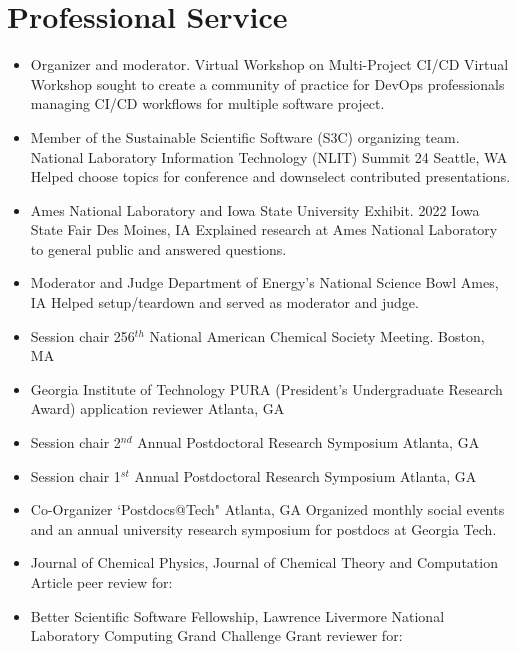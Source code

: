 \documentclass[11pt,a4paper,sans]{moderncv}
\begin{document}
\section{Professional Service}
\vspace{5pt}
\begin{itemize}
	\item{
	      {Organizer and moderator.}
	      {Virtual Workshop on Multi-Project CI/CD}
	      {Virtual}
	      {}
	      {Workshop sought to create a community of practice for DevOps 
		  professionals managing CI/CD workflows for multiple software 
		  project.}}
	\item{
		  {Member of the Sustainable Scientific Software (S3C) organizing team.}  
	      {National Laboratory Information Technology (NLIT) Summit 24}
		  {Seattle, WA}
		  {}
		  {Helped choose topics for conference and downselect contributed 
		  presentations.}}
	\item{
		  {Ames National Laboratory and Iowa State University Exhibit.}
	      {2022 Iowa State Fair}
		  {Des Moines, IA}
		  {}
		  {Explained research at Ames National Laboratory to general public and
		   answered questions.}}
	\item{
          {Moderator and Judge}
          {Department of Energy's National Science Bowl}
          {Ames, IA}
          {}
          {Helped setup/teardown and served as moderator and judge.}}
	\item{
	      {Session chair}
          {256$^{th}$ National American Chemical Society Meeting.}
          {Boston, MA}
          {}
          {}}
	\item{
          {Georgia Institute of Technology}
          {PURA (President's Undergraduate Research Award) application reviewer}
          {Atlanta, GA}
          {}
          {}}
	\item{
	     {Session chair}
         {2$^{nd}$ Annual Postdoctoral Research Symposium}
         {Atlanta, GA}
         {}
         {}}
	\item{
          {Session chair}
          {1$^{st}$ Annual Postdoctoral Research Symposium}
          {Atlanta, GA}
          {}
          {}}
	\item{
        {Co-Organizer}
        {`Postdocs@Tech"}
        {Atlanta, GA}
        {}
        {Organized monthly social events and an annual university research 
		 symposium for postdocs at Georgia Tech.}}
	\item{\cventry{}
          {Journal of Chemical Physics, Journal of Chemical Theory and
          Computation}
          {Article peer review for:}
		  {}
          {}
          {}}
    \item{\cventry{}
          	{Better Scientific Software Fellowship, Lawrence Livermore National Laboratory Computing Grand Challenge}
          	{Grant reviewer for:}
          	{}
          	{}
          	{}}
\end{itemize}
\end{document}
